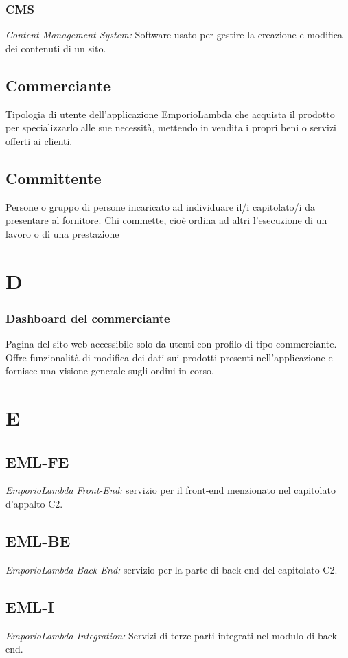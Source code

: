 \subsubsection*{CMS}
\textit{Content Management System:} Software usato per gestire la creazione e modifica dei contenuti di un sito.

\subsection*{Commerciante}
Tipologia di utente dell'applicazione EmporioLambda che acquista il prodotto per specializzarlo
alle sue necessità, mettendo in vendita i propri beni o servizi offerti ai clienti.

\subsection*{Committente}
Persone o gruppo di persone incaricato ad individuare il/i capitolato/i da presentare al fornitore.
Chi commette, cioè ordina ad altri l'esecuzione di un lavoro o di una prestazione


\section*{D}
\subsubsection*{Dashboard del commerciante}
Pagina del sito web accessibile solo da utenti con profilo di tipo commerciante. Offre funzionalità di modifica dei dati sui prodotti
presenti nell'applicazione e fornisce una visione generale sugli ordini in corso.

\section*{E}
\subsection*{EML-FE}
\textit{EmporioLambda Front-End:} servizio per il front-end menzionato nel capitolato d'appalto C2.

\subsection*{EML-BE}
\textit{EmporioLambda Back-End:} servizio per la parte di back-end del capitolato C2.

\subsection*{EML-I}
\textit{EmporioLambda Integration:} Servizi di terze parti integrati nel modulo di back-end.

